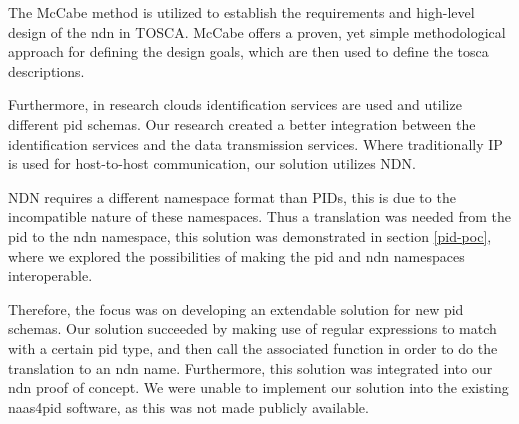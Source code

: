 The McCabe method \cite{mccabe2010network} is utilized to establish the requirements and high-level design of the \gls{ndn} in TOSCA. McCabe offers a proven, yet simple methodological approach for defining the design goals, which are then used to define the \gls{tosca} descriptions.

Furthermore, in research clouds identification services are used and utilize different \gls{pid} schemas. Our research created a better integration between the identification services and the data transmission services. Where traditionally IP is used for host-to-host communication, our solution utilizes NDN.







NDN requires a different namespace format than PIDs, this is due to the incompatible nature of these namespaces. Thus a translation was needed from the \gls{pid} to the \gls{ndn} namespace, this solution was demonstrated in section \ref{pid-poc}, where we explored the possibilities of making the \gls{pid} and \gls{ndn} namespaces interoperable.

Therefore, the focus was on developing an extendable solution for new \gls{pid} schemas. Our solution succeeded by making use of regular expressions to match with a certain \gls{pid} type, and then call the associated function in order to do the translation to an \gls{ndn} name. Furthermore, this solution was integrated into our \gls{ndn} proof of concept. We were unable to implement our solution into the existing \gls{naas4pid} software, as this was not made publicly available.

